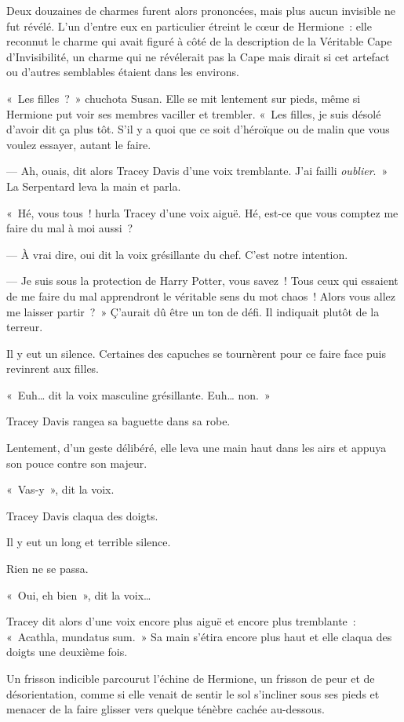 Deux douzaines de charmes furent alors prononcées, mais plus aucun invisible ne fut révélé.
L'un d'entre eux en particulier étreint le cœur de Hermione~: elle reconnut le charme qui avait figuré à côté de la description de la Véritable Cape d'Invisibilité, un charme qui ne révélerait pas la Cape mais dirait si cet artefact ou d'autres semblables étaient dans les environs.

«~Les filles~?~»
chuchota Susan.
Elle se mit lentement sur pieds, même si Hermione put voir ses membres vaciller et trembler.
«~Les filles, je suis désolé d'avoir dit ça plus tôt.
S'il y a quoi que ce soit d'héroïque ou de malin que vous voulez essayer, autant le faire.

--- Ah, ouais, dit alors Tracey Davis d'une voix tremblante.
J'ai failli \emph{oublier}.~»
La Serpentard leva la main et parla.

«~Hé, vous tous~! hurla Tracey d'une voix aiguë.
Hé, est-ce que vous comptez me faire du mal à moi aussi~?

--- À vrai dire, oui dit la voix grésillante du chef.
C'est notre intention.

--- Je suis sous la protection de Harry Potter, vous savez~!
Tous ceux qui essaient de me faire du mal apprendront le véritable sens du mot chaos~!
Alors vous allez me laisser partir~?~»
Ç'aurait dû être un ton de défi.
Il indiquait plutôt de la terreur.

Il y eut un silence.
Certaines des capuches se tournèrent pour ce faire face puis revinrent aux filles.

«~Euh… dit la voix masculine grésillante.
Euh… non.~»

Tracey Davis rangea sa baguette dans sa robe.

Lentement, d'un geste délibéré, elle leva une main haut dans les airs et appuya son pouce contre son majeur.

«~Vas-y~», dit la voix.

Tracey Davis claqua des doigts.

Il y eut un long et terrible silence.

Rien ne se passa.

«~Oui, eh bien~», dit la voix…

Tracey dit alors d'une voix encore plus aiguë et encore plus tremblante~: «~Acathla, mundatus sum.~»
Sa main s'étira encore plus haut et elle claqua des doigts une deuxième fois.

Un frisson indicible parcourut l'échine de Hermione, un frisson de peur et de désorientation, comme si elle venait de sentir le sol s'incliner sous ses pieds et menacer de la faire glisser vers quelque ténèbre cachée au-dessous.

